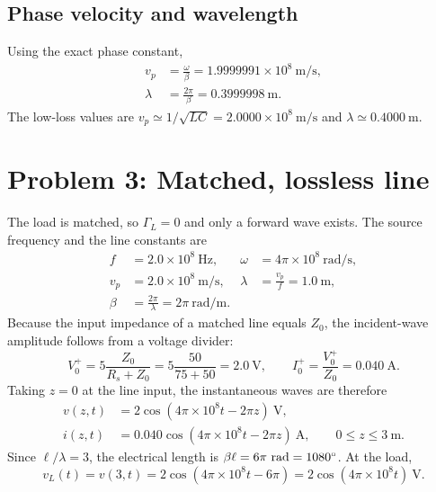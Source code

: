 \documentclass[12pt,a4paper]{article}
\begin{document}
\subsection{Phase velocity and wavelength}

Using the exact phase constant,
\begin{align}
v_p&=\frac{\omega}{\beta}=1.9999991\times10^8~\mathrm{m/s},\\
\lambda&=\frac{2\pi}{\beta}=0.3999998~\mathrm{m}.
\end{align}
The low-loss values are $v_p\simeq1/\sqrt{LC}=2.0000\times10^8~\mathrm{m/s}$
and $\lambda\simeq0.4000~\mathrm{m}$.


\section{Problem 3: Matched, lossless line}


The load is matched, so $\Gamma_L=0$ and only a forward wave exists.  The
source frequency and the line constants are
\begin{align*}
f&=2.0\times10^8~\mathrm{Hz}, &
\omega&=4\pi\times10^8~\mathrm{rad/s},\\
v_p&=2.0\times10^8~\mathrm{m/s}, &
\lambda&=\frac{v_p}{f}=1.0~\mathrm{m},\\
\beta&=\frac{2\pi}{\lambda}=2\pi~\mathrm{rad/m}.&&
\end{align*}
Because the input impedance of a matched line equals $Z_0$, the incident-wave
amplitude follows from a voltage divider:
\[
V_0^+=5\frac{Z_0}{R_s+Z_0}
=5\frac{50}{75+50}=2.0~\mathrm{V},
\qquad I_0^+=\frac{V_0^+}{Z_0}=0.040~\mathrm{A}.
\]
Taking $z=0$ at the line input, the instantaneous waves are therefore
\begin{align}
v(z,t)&=2\cos\left(4\pi\times10^8t-2\pi z\right)~\mathrm{V},\\
i(z,t)&=0.040\cos\left(4\pi\times10^8t-2\pi z\right)~\mathrm{A},
\qquad 0\le z\le3~\mathrm{m}.
\end{align}
Since $\ell/\lambda=3$, the electrical length is
$\beta\ell=6\pi~\mathrm{rad}=1080^{\circ}$.  At the load,
\[
v_L(t)=v(3,t)=2\cos(4\pi\times10^8t-6\pi)
=2\cos(4\pi\times10^8t)~\mathrm{V}.
\]
\end{document}
